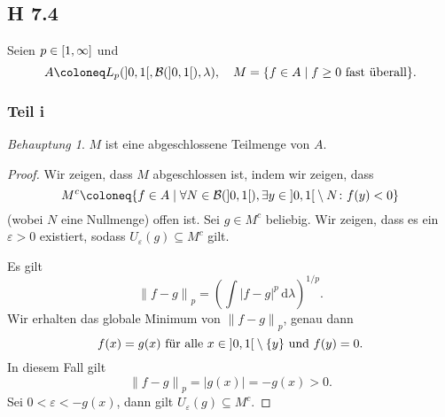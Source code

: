 \documentclass[draft,a5paper]{article}
\providecommand{\abs}[1]{\left\lvert#1\right\rvert}
\providecommand{\norm}[1]{\left\lVert#1\right\rVert}
\theoremstyle{remark}
\newtheorem*{Behauptung}{Behauptung}
\newcommand{\dd}{\,\mathrm{d}}
\begin{document}
\subsection{H 7.4}
Seien \(p \in \interval{1}{\infty}\) und
\[A \coloneq L_{p}(\ointerval{0}{1}, \mathcal{B}(\ointerval{0}{1}), \lambda), \quad M = \{f \in A\mid f \ge 0
  \text{ fast überall}\}.\]

\subsubsection{Teil i}

\begin{Behauptung}
  \(M\) ist eine abgeschlossene Teilmenge von \(A\).
\end{Behauptung}
\begin{proof}
  Wir zeigen, dass \(M\) abgeschlossen ist, indem wir zeigen, dass
  \[M^{c}\coloneq\{f \in A \mid \forall N \in  \mathcal{B}(\ointerval{0}{1}), \exists y \in \ointerval{0}{1}
    \setminus N \colon f(y) < 0\}\]
  (wobei \(N\) eine Nullmenge) offen ist.  Sei \(g \in M^{c}\) beliebig.  Wir zeigen, dass es ein \(\varepsilon >
  0\) existiert, sodass \(U_{\varepsilon}(g) \subseteq M^{c}\) gilt.

  Es gilt
  \[\norm{f - g}_{p} = \left(\int\abs{f-g}^{p}\dd \lambda\right)^{1/p}.\]
  Wir erhalten das globale Minimum von \(\norm{f-g}_{p}\), genau dann
  \[f(x) = g(x) \text{ für alle } x \in \ointerval{0}{1} \setminus \{y\} \text{
      und } f(y) = 0.\]
  In diesem Fall gilt
  \[\norm{f - g}_{p} = \abs{g(x)} = -g(x) > 0.\]
  Sei \(0 < \varepsilon < -g(x)\), dann gilt \(U_{\varepsilon}(g) \subseteq M^{c}\).
\end{proof}
\end{document}
